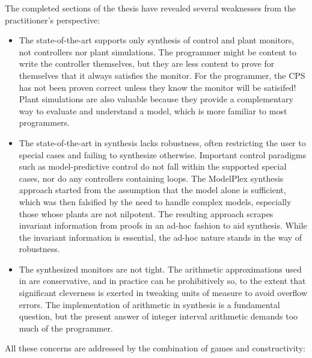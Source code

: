 \documentclass[12pt]{cmuthesis}
\theoremstyle{definition}
\theoremstyle{remark}
\newcommand{\rref}[2][]{\prettyref{#2}}
\newcommand{\ModelPlex}{ModelPlex\xspace}
\begin{document}
The completed sections of the thesis have revealed several weaknesses from the practitioner's perspective:
\begin{itemize}
\item
The state-of-the-art supports only synthesis of control and plant monitors, not controllers nor plant simulations.
The programmer might be content to write the controller themselves, but they are less content to prove for themselves that it always satisfies the monitor.
For the programmer, the CPS has not been proven correct unless they know the monitor will be satisifed!
Plant simulations are also valuable because they provide a complementary way to evaluate and understand a model, which is more familiar to most programmers.
\item
The state-of-the-art in synthesis lacks robustness, often restricting the user to special cases and failing to synthesize otherwise.
Important control paradigms such as model-predictive control do not fall within the supported special cases, nor do any controllers containing loops.
The \ModelPlex synthesis approach started from the assumption that the model alone is sufficient, which was then falsified by the need to handle complex models, especially those whose plants are not nilpotent.
The resulting approach scrapes invariant information from proofs in an ad-hoc fashion to aid synthesis.
While the invariant information is essential, the ad-hoc nature stands in the way of robustness.
\item
The synthesized monitors are not tight.
The arithmetic approximations used in \rref{sec:veriphy} are conservative, and in practice can be prohibitively so, to the extent that significant cleverness is exerted in tweaking units of measure to avoid overflow errors.
The implementation of arithmetic in synthesis is a fundamental question, but the present answer of integer interval arithmetic demands too much of the programmer.
\end{itemize}
All these concerns are addressed by the combination of games and constructivity:
\end{document}
